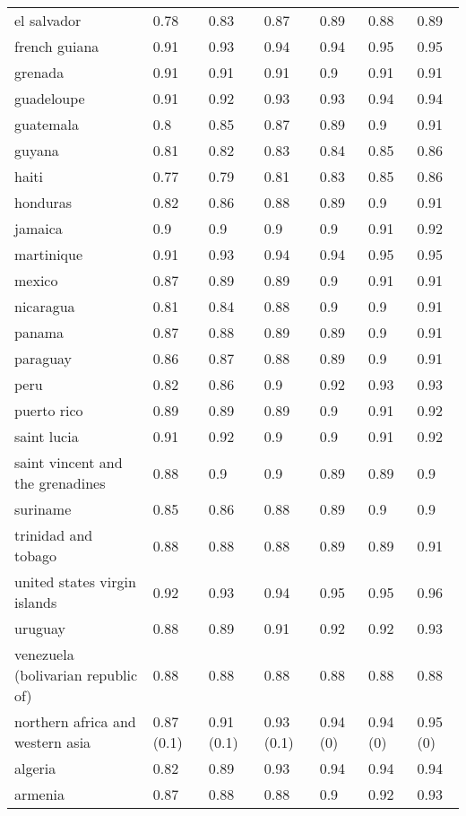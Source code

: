 \begin{longtable}[t]{lllllll}
el salvador & 0.78 & 0.83 & 0.87 & 0.89 & 0.88 & 0.89\\
french guiana & 0.91 & 0.93 & 0.94 & 0.94 & 0.95 & 0.95\\
grenada & 0.91 & 0.91 & 0.91 & 0.9 & 0.91 & 0.91\\
\addlinespace
guadeloupe & 0.91 & 0.92 & 0.93 & 0.93 & 0.94 & 0.94\\
guatemala & 0.8 & 0.85 & 0.87 & 0.89 & 0.9 & 0.91\\
guyana & 0.81 & 0.82 & 0.83 & 0.84 & 0.85 & 0.86\\
haiti & 0.77 & 0.79 & 0.81 & 0.83 & 0.85 & 0.86\\
honduras & 0.82 & 0.86 & 0.88 & 0.89 & 0.9 & 0.91\\
\addlinespace
jamaica & 0.9 & 0.9 & 0.9 & 0.9 & 0.91 & 0.92\\
martinique & 0.91 & 0.93 & 0.94 & 0.94 & 0.95 & 0.95\\
mexico & 0.87 & 0.89 & 0.89 & 0.9 & 0.91 & 0.91\\
nicaragua & 0.81 & 0.84 & 0.88 & 0.9 & 0.9 & 0.91\\
panama & 0.87 & 0.88 & 0.89 & 0.89 & 0.9 & 0.91\\
\addlinespace
paraguay & 0.86 & 0.87 & 0.88 & 0.89 & 0.9 & 0.91\\
peru & 0.82 & 0.86 & 0.9 & 0.92 & 0.93 & 0.93\\
puerto rico & 0.89 & 0.89 & 0.89 & 0.9 & 0.91 & 0.92\\
saint lucia & 0.91 & 0.92 & 0.9 & 0.9 & 0.91 & 0.92\\
saint vincent and the grenadines & 0.88 & 0.9 & 0.9 & 0.89 & 0.89 & 0.9\\
\addlinespace
suriname & 0.85 & 0.86 & 0.88 & 0.89 & 0.9 & 0.9\\
trinidad and tobago & 0.88 & 0.88 & 0.88 & 0.89 & 0.89 & 0.91\\
united states virgin islands & 0.92 & 0.93 & 0.94 & 0.95 & 0.95 & 0.96\\
uruguay & 0.88 & 0.89 & 0.91 & 0.92 & 0.92 & 0.93\\
venezuela (bolivarian republic of) & 0.88 & 0.88 & 0.88 & 0.88 & 0.88 & 0.88\\
\addlinespace
northern africa and western asia & 0.87 (0.1) & 0.91 (0.1) & 0.93 (0.1) & 0.94 (0) & 0.94 (0) & 0.95 (0)\\
algeria & 0.82 & 0.89 & 0.93 & 0.94 & 0.94 & 0.94\\
armenia & 0.87 & 0.88 & 0.88 & 0.9 & 0.92 & 0.93\\

\end{longtable}
